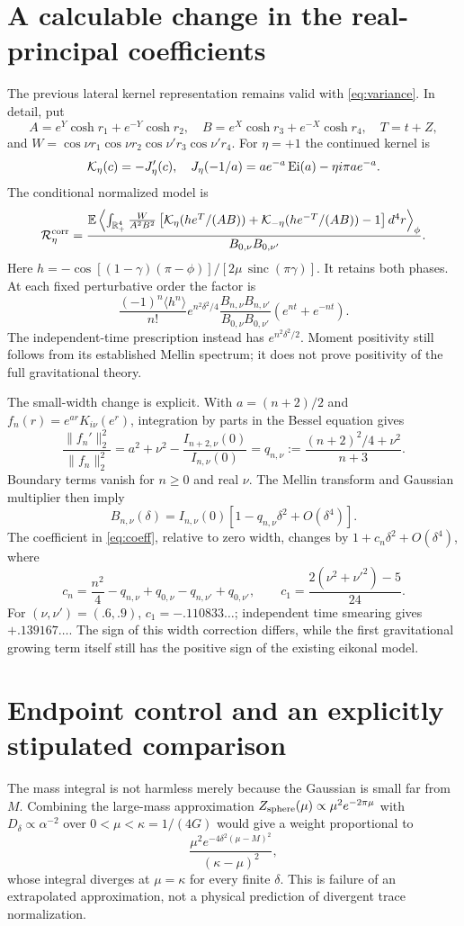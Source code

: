 \documentclass[11pt,a4paper]{article}
\newcommand{\E}{\mathbb E}
\newcommand{\R}{\mathcal R}
\begin{document}
\newpage
\section{A calculable change in the real-principal coefficients}
The previous lateral kernel representation remains valid with
\eqref{eq:variance}. In detail, put
\[
 A=e^Y\cosh r_1+e^{-Y}\cosh r_2,\quad
 B=e^X\cosh r_3+e^{-X}\cosh r_4,\quad T=t+Z,
\]
and $W=\cos\nu r_1\cos\nu r_2\cos\nu'r_3\cos\nu'r_4$.
For $\eta=+1$ the continued kernel is
\[
 {\cal K}_\eta(c)=-J_\eta'(c),\quad
 J_\eta(-1/a)=ae^{-a}\operatorname{Ei}(a)-\eta i\pi ae^{-a}.
\]
The conditional normalized model is
\[
 \R^{\rm corr}_\eta=
 \frac{\E\left\langle\int_{\mathbb R_+^4}
 \frac{W}{A^2B^2}
 \left[{\cal K}_\eta(he^T/(AB))+{\cal K}_{-\eta}(he^{-T}/(AB))-1\right]
 d^4r\right\rangle_\phi}{B_{0,\nu}B_{0,\nu'}}.
\]
Here $h=-\cos[(1-\gamma)(\pi-\phi)]/[2\mu\,\operatorname{sinc}(\pi\gamma)]$.
It retains both phases. At each fixed perturbative order the factor is
\begin{equation}
 \frac{(-1)^n\langle h^n\rangle}{n!}
 e^{n^2\delta^2/4}\frac{B_{n,\nu}B_{n,\nu'}}{B_{0,\nu}B_{0,\nu'}}
 (e^{nt}+e^{-nt}). \label{eq:coeff}
\end{equation}
The independent-time prescription instead has $e^{n^2\delta^2/2}$.
Moment positivity still follows from its established Mellin spectrum;
it does not prove positivity of the full gravitational theory.

The small-width change is explicit. With $a=(n+2)/2$ and
$f_n(r)=e^{ar}K_{i\nu}(e^r)$, integration by parts in the Bessel
equation gives
\[
 \frac{\|f_n'\|_2^2}{\|f_n\|_2^2}
 =a^2+\nu^2-\frac{I_{n+2,\nu}(0)}{I_{n,\nu}(0)}
 =q_{n,\nu}:=\frac{(n+2)^2/4+\nu^2}{n+3}.
\]
Boundary terms vanish for $n\geq0$ and real $\nu$.
The Mellin transform and Gaussian multiplier then imply
\[
 B_{n,\nu}(\delta)=I_{n,\nu}(0)
 [1-q_{n,\nu}\delta^2+O(\delta^4)].
\]
The coefficient in \eqref{eq:coeff}, relative to zero width, changes by
$1+c_n\delta^2+O(\delta^4)$, where
\[
 c_n=\frac{n^2}{4}-q_{n,\nu}+q_{0,\nu}
                  -q_{n,\nu'}+q_{0,\nu'},\qquad
 c_1=\frac{2(\nu^2+\nu'^2)-5}{24}.
\]
For $(\nu,\nu')=(.6,.9)$, $c_1=-.110833\ldots$; independent
time smearing gives $+.139167\ldots$. The sign of this width
correction differs, while the first gravitational growing term itself
still has the positive sign of the existing eikonal model.

\newpage
\section{Endpoint control and an explicitly stipulated comparison}
The mass integral is not harmless merely because the Gaussian is
small far from $M$. Combining the large-mass approximation
$Z_{\rm sphere}(\mu)\propto\mu^2e^{-2\pi\mu}$ with
$D_\delta\propto\alpha^{-2}$ over $0<\mu<\kappa=1/(4G)$
would give a weight proportional to
\[
 \frac{\mu^2e^{-4\delta^2(\mu-M)^2}}{(\kappa-\mu)^2},
\]
whose integral diverges at $\mu=\kappa$ for every finite $\delta$.
This is failure of an extrapolated approximation, not a physical
prediction of divergent trace normalization.
\end{document}
